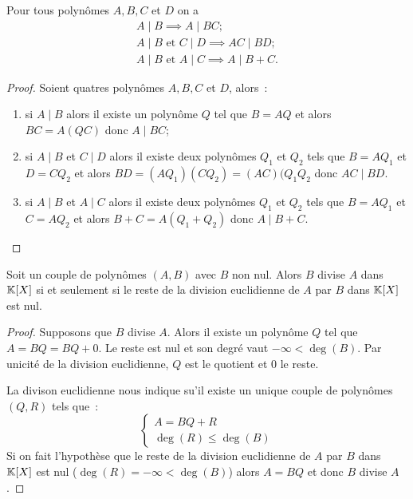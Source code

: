 \begin{prop}
  Pour tous polynômes \(A,B,C\) et \(D\) on a
  \begin{gather}
    A\mid{}B \implies A\mid{}BC ;\\
    A\mid{}B \text{~et~} C\mid{}D \implies AC\mid{}BD ;\\
    A\mid{}B \text{~et~} A\mid{}C \implies A\mid{}B+C.
  \end{gather}
\end{prop}
\begin{proof} Soient quatres polynômes \(A,B,C\) et \(D\), alors~:
  \begin{enumerate}
  \item si \(A\mid{}B\) alors il existe un polynôme \(Q\) tel que \(B=AQ\) et alors \(BC=A(QC)\) donc \(A\mid{}BC\);
  \item si \(A\mid{}B\) et \(C\mid{}D\) alors il existe deux polynômes \(Q_1\) et \(Q_2\) tels que \(B=AQ_1\) et \(D=CQ_2\) et alors \(BD = (AQ_1)(CQ_2)=(AC)(Q_1Q_2\) donc \(AC\mid{}BD\).
  \item si \(A\mid{}B\) et \(A\mid{}C\) alors il existe deux polynômes \(Q_1\) et \(Q_2\) tels que \(B=AQ_1\) et \(C=AQ_2\) et alors \(B+C = A(Q_1+Q_2)\) donc \(A\mid{}B+C\).
  \end{enumerate}
\end{proof}

\begin{prop}
  Soit un couple de polynômes \((A,B)\) avec \(B\) non nul. Alors \(B\) divise \(A\) dans \(\mathbb{K}[X]\) si et seulement si le reste de la division euclidienne de \(A\) par \(B\) dans \(\mathbb{K}[X]\) est nul.
\end{prop}
\begin{proof}
  Supposons que \(B\) divise \(A\). Alors il existe un polynôme \(Q\) tel que \(A=BQ = BQ+0\). Le reste est nul et son degré vaut \(-\infty < \deg(B)\). Par unicité de la division euclidienne, \(Q\) est le quotient et \(0\) le reste.

  La divison euclidienne nous indique su'il existe un unique couple de polynômes \((Q,R)\) tels que~:
  \begin{equation}
    \begin{cases}
      A=BQ+R \\ \deg(R) \leqslant \deg(B)
    \end{cases}
  \end{equation}
  Si on fait l'hypothèse que le reste de la division euclidienne de \(A\) par \(B\) dans \(\mathbb{K}[X]\) est nul (\(\deg(R)=-\infty<\deg(B)\)) alors \(A=BQ\) et donc \(B\) divise \(A\).
\end{proof}

